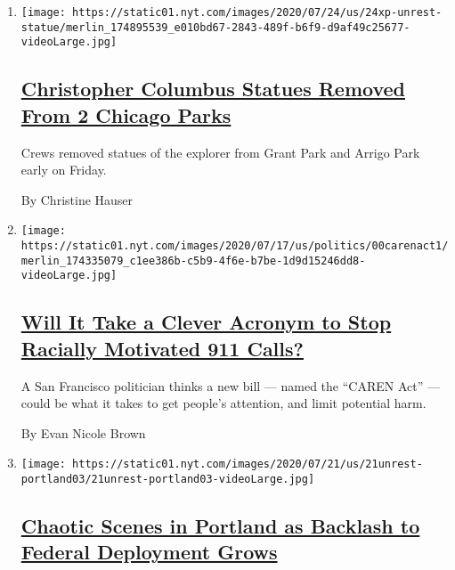 \begin{enumerate}
\def\labelenumi{\arabic{enumi}.}
\item
  \texttt{[image: https://static01.nyt.com/images/2020/07/24/us/24xp-unrest-statue/merlin\_174895539\_e010bd67-2843-489f-b6f9-d9af49c25677-videoLarge.jpg]}

  \hypertarget{christopher-columbus-statues-removed-from-2-chicago-parks}{%
  \subsection{\texorpdfstring{\href{/2020/07/24/us/christopher-columbus-chicago.html}{Christopher
  Columbus Statues Removed From 2 Chicago
  Parks}}{Christopher Columbus Statues Removed From 2 Chicago Parks}}\label{christopher-columbus-statues-removed-from-2-chicago-parks}}

  Crews removed statues of the explorer from Grant Park and Arrigo Park
  early on Friday.

  By Christine Hauser
\item
  \texttt{[image: https://static01.nyt.com/images/2020/07/17/us/politics/00carenact1/merlin\_174335079\_c1ee386b-c5b9-4f6e-b7be-1d9d15246dd8-videoLarge.jpg]}

  \hypertarget{will-it-take-a-clever-acronym-to-stop-racially-motivated-911-calls}{%
  \subsection{\texorpdfstring{\href{/2020/07/24/briefing/caren-act-911-san-francisco.html}{Will
  It Take a Clever Acronym to Stop Racially Motivated 911
  Calls?}}{Will It Take a Clever Acronym to Stop Racially Motivated 911 Calls?}}\label{will-it-take-a-clever-acronym-to-stop-racially-motivated-911-calls}}

  A San Francisco politician thinks a new bill --- named the ``CAREN
  Act'' --- could be what it takes to get people's attention, and limit
  potential harm.

  By Evan Nicole Brown
\item
  \texttt{[image: https://static01.nyt.com/images/2020/07/21/us/21unrest-portland03/21unrest-portland03-videoLarge.jpg]}

  \hypertarget{chaotic-scenes-in-portland-as-backlash-to-federal-deployment-grows}{%
  \subsection{\texorpdfstring{\href{/2020/07/21/us/portland-protests.html}{Chaotic
  Scenes in Portland as Backlash to Federal Deployment
  Grows}}{Chaotic Scenes in Portland as Backlash to Federal Deployment Grows}}\label{chaotic-scenes-in-portland-as-backlash-to-federal-deployment-grows}}


\end{enumerate}

